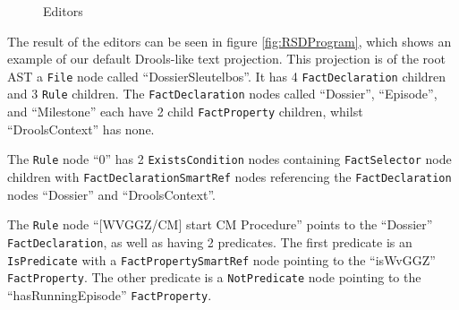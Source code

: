 \begin{figure}
    \centering
    \caption{Editors}
    \label{fig:RSDEditors}
\end{figure}

\newpage

The result of the editors can be seen in figure \ref{fig:RSDProgram}, which shows an example of our default Drools-like text projection. 
This projection is of the root AST a \texttt{File} node called ``DossierSleutelbos''.
It has 4 \texttt{FactDeclaration} children and 3 \texttt{Rule} children.
The \texttt{FactDeclaration} nodes called ``Dossier'', ``Episode'', and ``Milestone'' each have 2 child \texttt{FactProperty} children, whilst ``DroolsContext'' has none.

The \texttt{Rule} node ``0'' has 2 \texttt{ExistsCondition} nodes containing \texttt{FactSelector} node children with \linebreak\texttt{FactDeclarationSmartRef} nodes referencing the \texttt{FactDeclaration} nodes ``Dossier'' and ``DroolsContext''.

The \texttt{Rule} node ``[WVGGZ/CM] start CM Procedure'' points to the ``Dossier'' \texttt{FactDeclaration}, as well as having 2 predicates.
The first predicate is an \texttt{IsPredicate} with a \texttt{FactPropertySmartRef} node pointing to the ``isWvGGZ'' \texttt{FactProperty}.
The other predicate is a \texttt{NotPredicate} node pointing to the ``hasRunningEpisode'' \texttt{FactProperty}.

